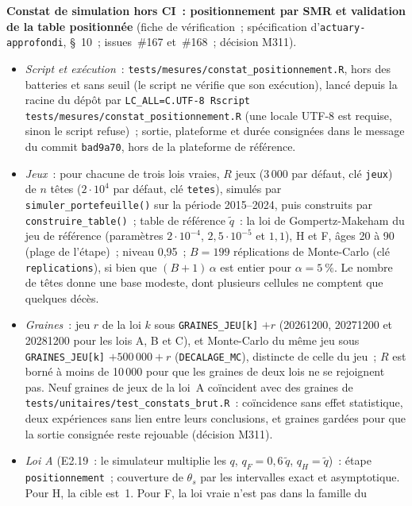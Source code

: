 \documentclass[a4paper,11pt]{article}
\newcommand{\code}[1]{\texttt{\small #1}}
\begin{document}
\medskip
\noindent
\textbf{Constat de simulation hors CI~: positionnement par SMR et
validation de la table positionnée} (fiche de vérification~; spécification
d'\code{actuary-approfondi}, §~10~; issues~\#167 et~\#168~; décision M311).
\begin{itemize}[leftmargin=*, itemsep=2pt]
  \item \emph{Script et exécution}~: \code{tests/mesures/constat\_positionnement.R},
    hors des batteries et sans seuil (le script ne vérifie que son
    exécution), lancé depuis la racine du dépôt par
    \code{LC\_ALL=C.UTF-8 Rscript tests/mesures/constat\_positionnement.R}
    (une locale UTF-8 est requise, sinon le script refuse)~; sortie,
    plateforme et durée consignées dans le message du commit
    \code{bad9a70}, hors de la plateforme de référence.
  \item \emph{Jeux}~: pour chacune de trois lois vraies, $R$ jeux (3\,000
    par défaut, clé \code{jeux}) de $n$ têtes ($2 \cdot 10^4$ par défaut,
    clé \code{tetes}), simulés par \code{simuler\_portefeuille()} sur la
    période 2015--2024, puis construits par \code{construire\_table()}~;
    table de référence $\tilde q$~: la loi de Gompertz-Makeham du jeu de
    référence (paramètres $2 \cdot 10^{-4}$, $2{,}5 \cdot 10^{-5}$ et
    $1{,}1$), H et F, âges 20 à 90 (plage de l'étape)~; niveau 0,95~;
    $B = 199$ réplications de Monte-Carlo (clé \code{replications}), si bien
    que $(B + 1)\,\alpha$ est entier pour $\alpha = 5~\%$. Le nombre de têtes
    donne une base modeste, dont plusieurs cellules ne comptent que
    quelques décès.
  \item \emph{Graines}~: jeu $r$ de la loi $k$ sous \code{GRAINES\_JEU[k]}
    $+ r$ (20261200, 20271200 et 20281200 pour les lois A, B et C), et
    Monte-Carlo du même jeu sous \code{GRAINES\_JEU[k]} $+ 500\,000 + r$
    (\code{DECALAGE\_MC}), distincte de celle du jeu~; $R$ est borné à
    moins de 10\,000 pour que les graines de deux lois ne se rejoignent
    pas. Neuf graines de jeux de la loi~A coïncident avec des graines de
    \code{tests/unitaires/test\_constats\_brut.R}~: coïncidence sans effet
    statistique, deux expériences sans lien entre leurs conclusions, et
    graines gardées pour que la sortie consignée reste rejouable
    (décision M311).
  \item \emph{Loi A} (E2.19~: le simulateur multiplie les $q$, $q_F =
    0{,}6\,\tilde q$, $q_H = \tilde q$)~: étape \code{positionnement}~;
    couverture de $\theta_s$ par les intervalles exact et asymptotique. Pour
    H, la cible est~1. Pour F, la loi vraie n'est pas dans la famille du

\end{itemize}
\end{document}
